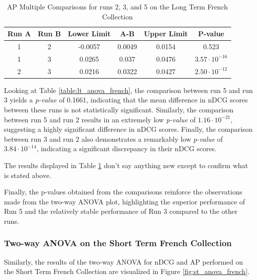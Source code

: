 \begin{table}[!h]
    \centering
    \caption{\ac{AP} Multiple Comparisons for runs 2, 3, and 5 on the Long Term French Collection}
    \label{table:lt_anova_french_ap}
    \begin{tabular}{cccccc}
    \hline
    Run A & Run B & Lower Limit & A-B & Upper Limit & P-value \\ \hline
    1 & 2 & -0.0057 & 0.0049 & 0.0154 & 0.523 \\
    1 & 3 & 0.0265 & 0.037 & 0.0476 & $3.57 \cdot 10^{-16}$ \\
    2 & 3 & 0.0216 & 0.0322 & 0.0427 & $2.50 \cdot 10^{-12}$ \\ \hline
    \end{tabular}
\end{table}

Looking at Table \ref{table:lt_anova_french}, the comparison between run 5 and run 3 yields a \textit{p-value} of 0.1661, indicating that the mean difference in \ac{nDCG} scores between these runs is not statistically significant.
Similarly, the comparison between run 5 and run 2 results in an extremely low \textit{p-value} of $1.16 \cdot 10^{-21}$, suggesting a highly significant difference in \ac{nDCG} scores.
Finally, the comparison between run 3 and run 2 also demonstrates a remarkably low \textit{p-value} of $3.84 \cdot 10^{-14}$, indicating a significant discrepancy in their \ac{nDCG} scores.

The results displayed in Table \ref{table:lt_anova_french_ap} don't say anything new except to confirm what is stated above.

Finally, the p-values obtained from the comparisons reinforce the observations made from the two-way \ac{ANOVA} plot, highlighting the superior performance of Run 5 and the relatively stable performance of Run 3 compared to the other runs.

\newpage
\enlargethispage{10\baselineskip}
\subsubsection{Two-way ANOVA on the Short Term French Collection}

Similarly, the results of the two-way \ac{ANOVA} for \ac{nDCG} and \ac{AP} performed on the Short Term French Collection are visualized in Figure \ref{fig:st_anova_french}.

